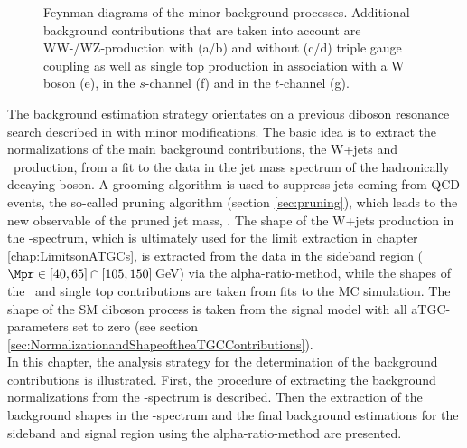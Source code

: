 \begin{figure}[h!]
	\centering
	\caption[Feynman diagrams of the minor background processes]{Feynman diagrams of the minor background processes. Additional background contributions that are taken into account are WW-/WZ-production with (a/b) and without (c/d) triple gauge coupling as well as single top production in association with a W boson (e), in the $s$-channel (f) and in the $t$-channel (g).}
\end{figure}
\newpage

\noindent The background estimation strategy orientates on a previous diboson resonance search described in \cite{resonancepas} with minor modifications. The basic idea is to extract the normalizations of the main background contributions, the W+jets and \ttbar \ production, from a fit to the data in the jet mass spectrum of the hadronically decaying boson. A grooming algorithm is used to suppress jets coming from QCD events, the so-called pruning algorithm (section \ref{sec:pruning}), which leads to the new observable of the pruned jet mass, \Mpr . The shape of the W+jets production in the \MWV -spectrum, which is ultimately used for the limit extraction in chapter \ref{chap:LimitsonATGCs}, is extracted from the data in the sideband region ($\Mpr \in [40,65] \cap [105,150]$\,GeV) via the alpha-ratio-method, while the shapes of the \ttbar \ and single top contributions are taken from fits to the MC simulation. The shape of the SM diboson process is taken from the signal model with all aTGC-parameters set to zero (see section \ref{sec:NormalizationandShapeoftheaTGCContributions}).\\

\noindent In this chapter, the analysis strategy for the determination of the background contributions is illustrated. First, the procedure of extracting the background normalizations from the \Mpr -spectrum is described. Then the extraction of the background shapes in the \MWV -spectrum and the final background estimations for the sideband and signal region using the alpha-ratio-method are presented.


